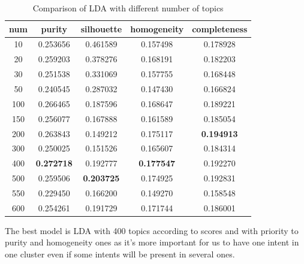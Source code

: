 \documentclass[11pt]{article}
\begin{document}
\begin{table}[htb]
\begin{center}
\begin{tabular}{ |c|c|c|c|c| }
\hline
num & purity  & silhouette  & homogeneity  & completeness \\ \hline 
10  & 0.253656  & 0.461589  & 0.157498  & 0.178928  \\ \hline 
20  & 0.259203  & 0.378276  & 0.168191  & 0.182203  \\ \hline 
30  & 0.251538  & 0.331069  & 0.157755  & 0.168448  \\ \hline 
50  & 0.240545  & 0.287032  & 0.147430  & 0.166824  \\ \hline 
100  & 0.266465  & 0.187596  & 0.168647  & 0.189221 \\ \hline 
150  & 0.256077  & 0.167888  & 0.161589  & 0.185054 \\ \hline 
200  & 0.263843  & 0.149212  & 0.175117  & \textbf{0.194913} \\ \hline 
300  & 0.250025  & 0.151526  & 0.165607  & 0.184314 \\ \hline 
400  & \textbf{0.272718}  & 0.192777  & \textbf{0.177547}  & 0.192270 \\ \hline 
500  & 0.259506  & \textbf{0.203725}  & 0.174925  & 0.192831 \\ \hline 
550  & 0.229450  & 0.166200  & 0.149270  & 0.158548 \\ \hline 
600  & 0.254261  & 0.191729  & 0.171744  & 0.186001 \\
\hline 
\end{tabular}
\caption{Comparison of LDA with different number of topics}
\label{LDA_num_topic}
\end{center}
\end{table}
\FloatBarrier

The best model is LDA with 400 topics according to scores and with priority to purity and homogeneity ones as it's more important for us to have one intent in one cluster even if some intents will be present in several ones.
\end{document}
